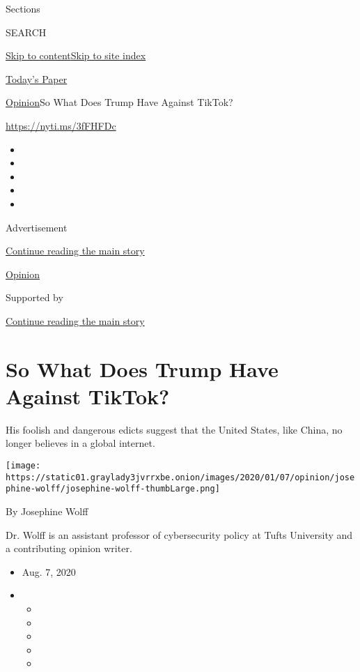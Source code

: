 Sections

SEARCH

\protect\hyperlink{site-content}{Skip to
content}\protect\hyperlink{site-index}{Skip to site index}

\href{https://myaccount.nytimes3xbfgragh.onion/auth/login?response_type=cookie\&client_id=vi}{}

\href{https://www.nytimes3xbfgragh.onion/section/todayspaper}{Today's
Paper}

\href{/section/opinion}{Opinion}\textbar{}So What Does Trump Have
Against TikTok?

\href{https://nyti.ms/3fFHFDc}{https://nyti.ms/3fFHFDc}

\begin{itemize}
\item
\item
\item
\item
\item
\end{itemize}

Advertisement

\protect\hyperlink{after-top}{Continue reading the main story}

\href{/section/opinion}{Opinion}

Supported by

\protect\hyperlink{after-sponsor}{Continue reading the main story}

\hypertarget{so-what-does-trump-have-against-tiktok}{%
\section{So What Does Trump Have Against
TikTok?}\label{so-what-does-trump-have-against-tiktok}}

His foolish and dangerous edicts suggest that the United States, like
China, no longer believes in a global internet.

\texttt{[image: https://static01.graylady3jvrrxbe.onion/images/2020/01/07/opinion/josephine-wolff/josephine-wolff-thumbLarge.png]}

By Josephine Wolff

Dr. Wolff is an assistant professor of cybersecurity policy at Tufts
University and a contributing opinion writer.

\begin{itemize}
\item
  Aug. 7, 2020
\item
  \begin{itemize}
  \item
  \item
  \item
  \item
  \item
  \end{itemize}
\end{itemize}

